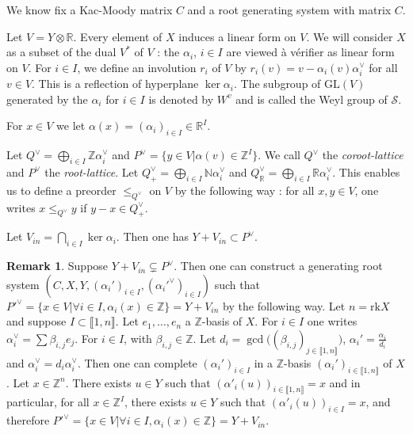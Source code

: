 \documentclass[12pt]{article}
\theoremstyle{plain}
\theoremstyle{definition}
\newtheorem{rque}[thm]{Remark}
\newcommand{\R}{\mathbb{R}}
\newcommand{\N}{\mathbb{N}}
\newcommand{\Z}{\mathbb{Z}}
\begin{document}
 We know fix a Kac-Moody matrix $C$ and a root generating system with matrix $C$.



Let $V=Y\otimes \R$. Every element of $X$ induces a linear form on $V$. We will consider $X$ as a subset of the dual $V^*$ of $V$ : the $\alpha_i$, $i\in I$ are viewed à vérifier as linear form on $V$. For $i\in I$, we define an involution $r_i$ of $V$ by $r_i(v)=v-\alpha_i(v)\alpha_i^\vee$ for all $v\in V$. This is a reflection of hyperplane $\ker \alpha_i$. The subgroup of $\mathrm{GL}(V)$ generated by the $\alpha_i$ for $i\in I$ is denoted by $W^v$ and is called the Weyl group of $\mathcal S$.


For $x\in V$ we let $\alpha(x)=(\alpha_i)_{i\in I}\in \R^I$.

Let  $Q^\vee=\bigoplus_{i\in I}\Z\alpha_i^\vee$ and $P^\vee=\{y\in V |\alpha(v)\in \Z^I\}$. We call  $Q^\vee$ the \textit{coroot-lattice} and $P^\vee$ the \textit{root-lattice}. Let $Q_+^\vee=\bigoplus_{i\in I}\N \alpha_i^\vee$ and $Q^\vee_{\mathbb{R}}=\bigoplus_{i\in I}\R\alpha_i^\vee$. This enables us to define a preorder $\leq_{Q^\vee}$ on $V$ by the following way : for all $x,y\in V$, one writes $x\leq_{Q^\vee}y$ if $y-x\in Q^\vee_+$. 




Let $V_{in}=\bigcap_{i\in I}\ker \alpha_i$. Then one has $Y+V_{in}\subset P^\vee$. 


\begin{rque}
Suppose $Y+V_{in}\varsubsetneq P^\vee$. Then one can construct a generating root system $(C,X,Y,(\alpha_i')_{i\in I},(\alpha_i'^\vee)_{i\in I})$ such that $P'^\vee=\{x\in V|\forall i\in I, \alpha_i(x)\in \Z\}=Y+V_{in}$ by the following way.
 Let $n=\mathrm{rk} X$ and suppose $I\subset\llbracket 1,n\rrbracket$. Let $e_1,\ldots,e_n$ a $\mathbb{Z}$-basis of $X$. For $i\in I$ one writes 
$\alpha_i^\vee=\sum\beta_{i,j}e_j$. For $i\in I$, with $\beta_{i,j}\in \Z$. Let 
$d_i=\gcd\big((\beta_{i,j})_{j\in \llbracket 1 ,n\rrbracket}\big)$,  $\alpha_i'=\frac{\alpha_i}{d_i}$ and $\alpha_i^\vee=d_i\alpha_i^\vee$. Then one can complete $(\alpha_i')_{i\in I}$ in a $\Z$-basis $(\alpha_i')_{i\in \llbracket 1, n\rrbracket} $ of $X$. Let $x\in \Z^n$. There exists $u\in Y$ such that $(\alpha'_i(u))_{i\in \llbracket 1,n\rrbracket}=x$ and in particular, for all $x\in \Z^I$, there exists $u\in Y$ such that $(\alpha'_i(u))_{i\in I}=x$, and therefore $P'^\vee=\{x\in V|\forall i\in I, \alpha_i(x)\in \Z\}=Y+V_{in}.$
\end{rque}
\end{document}
